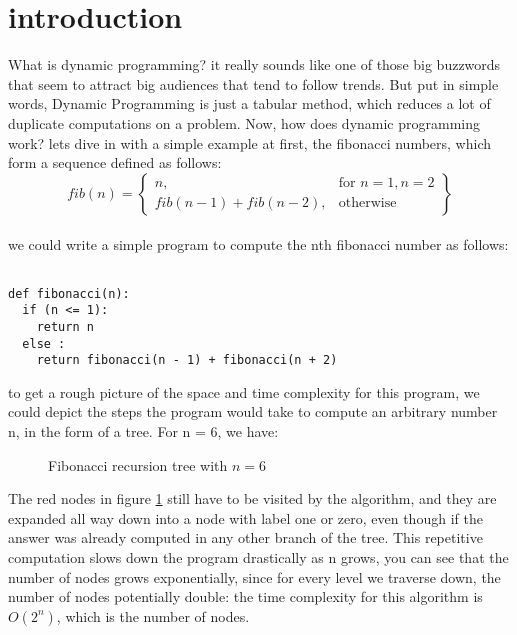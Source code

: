 
 
 \section{introduction}


What is dynamic programming? it really sounds like one of those big buzzwords that seem to
attract big audiences that tend to follow trends. But put in simple words, Dynamic Programming is just a tabular method, 
which reduces a lot of duplicate computations on a problem. Now, how does dynamic programming work? lets dive in with a simple example at first, the fibonacci numbers,
which form a sequence defined as follows:
  \\
  \[
    fib(n) = \left\{\begin{array}{lr}
      n, & \text{for } n = 1, n = 2\\
      fib(n-1) + fib(n-2), & \text{otherwise}
      \end{array}\right\}
  \]
  \\

we could write a simple program to compute the nth fibonacci number as follows:

\begin{verbatim}

def fibonacci(n):
  if (n <= 1):
    return n
  else :
    return fibonacci(n - 1) + fibonacci(n + 2)

\end{verbatim}


to get a rough picture of the space and time complexity for this program, we could depict the steps
the program would take to compute an arbitrary number n, in the form of a tree. For n = 6, we have:


\begin{figure}[ht]
  \centering
  \caption{Fibonacci recursion tree with $n = 6$}
  \label{fig:fib1}
\end{figure}

The red nodes in figure \ref{fig:fib1} still have to be visited by the algorithm, and they are expanded all 
way down into a node with label one or zero, even though if the answer was already computed in any other 
branch of the tree. This repetitive computation slows down the program drastically as n grows,
you can see that the number of nodes grows exponentially, since for every level we traverse down,
the number of nodes potentially double: the time complexity for this algorithm is $O(2^n)$, which is 
the number of nodes.

